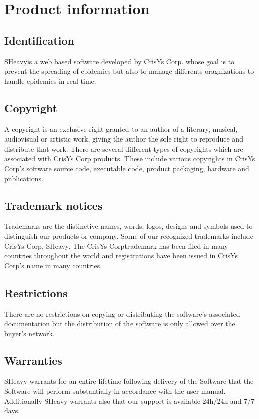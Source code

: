 \chapter{Product information}
\vspace{-6em}

\section{Identification}
SHeavy\textregistered is a web based software developed by CrisYs Corp. whose goal is to
prevent the spreading of epidemics but also to manage differents oragnizations to handle epidemics
in real time.

\section{Copyright}
A copyright is an exclusive right granted to an author of a literary, musical,
audiovisual or artistic work, giving the author the sole right to reproduce and distribute that work. 
There are several different types of copyrights which are associated with CrisYs
Corp products. These include various copyrights in CrisYs Corp's
software source code, executable code, product packaging, hardware and publications.

\section{Trademark notices}
Trademarks are the distinctive names, words, logos, designs and symbols used to distinguish our
products or company. Some of our recognized trademarks include CrisYs
Corp\textregistered, SHeavy\textregistered. The CrisYs Corp\textregistered trademark has been filed
in many countries throughout the world and registrations have been issued in
CrisYs Corp's name in many countries.

\section{Restrictions}
There are no restrictions on copying or distributing the
software's associated documentation but the distribution of the software is only
allowed over the buyer's network.

\section{Warranties}
SHeavy warrants for an entire lifetime following delivery of the Software that
the Software will perform substantially in accordance with the user manual.
Additionally SHeavy warrants also that our support is available 24h/24h and
7/7 days.

